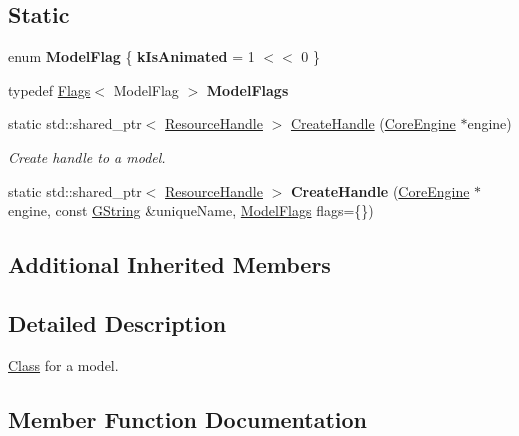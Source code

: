 \subsection*{Static}
\begin{DoxyCompactItemize}
\item 
\mbox{\label{classrev_1_1_model_a9d929d1f68eede6ddddf78f359fb5427}} 
enum {\bfseries Model\+Flag} \{ {\bfseries k\+Is\+Animated} = 1 $<$$<$ 0
 \}
\item 
\mbox{\label{classrev_1_1_model_a013ad8f36462d14d845cf1c5581cc5a6}} 
typedef \mbox{\hyperlink{classrev_1_1_flags}{Flags}}$<$ Model\+Flag $>$ {\bfseries Model\+Flags}
\item 
\mbox{\label{classrev_1_1_model_a14f2db8d40174aa831a5af96823d643c}} 
static std\+::shared\+\_\+ptr$<$ \mbox{\hyperlink{classrev_1_1_resource_handle}{Resource\+Handle}} $>$ \mbox{\hyperlink{classrev_1_1_model_a14f2db8d40174aa831a5af96823d643c}{Create\+Handle}} (\mbox{\hyperlink{classrev_1_1_core_engine}{Core\+Engine}} $\ast$engine)
\begin{DoxyCompactList}\small\item\em Create handle to a model. \end{DoxyCompactList}\item 
\mbox{\label{classrev_1_1_model_a6b22472f69c93f1581b11c525dc955d0}} 
static std\+::shared\+\_\+ptr$<$ \mbox{\hyperlink{classrev_1_1_resource_handle}{Resource\+Handle}} $>$ {\bfseries Create\+Handle} (\mbox{\hyperlink{classrev_1_1_core_engine}{Core\+Engine}} $\ast$engine, const \mbox{\hyperlink{classrev_1_1_g_string}{G\+String}} \&unique\+Name, \mbox{\hyperlink{classrev_1_1_flags}{Model\+Flags}} flags=\{\})
\end{DoxyCompactItemize}
\subsection*{Additional Inherited Members}


\subsection{Detailed Description}
\mbox{\hyperlink{struct_class}{Class}} for a model. 

\subsection{Member Function Documentation}
\mbox{\label{classrev_1_1_model_a5294b11c432c67e5e89b76af767d9305}} 
